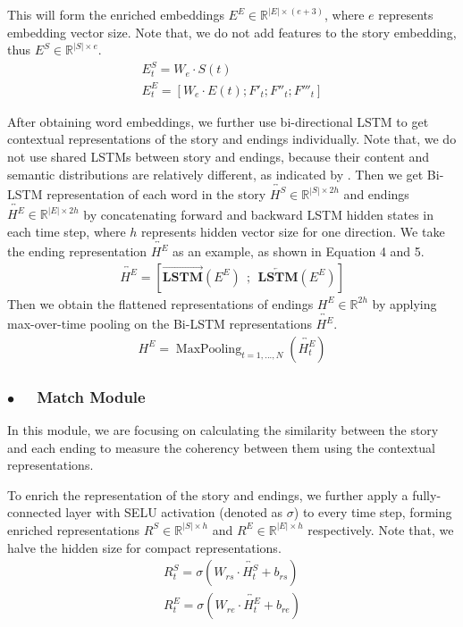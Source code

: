 \documentclass[letterpaper]{article} %
\begin{document}
This will form the enriched embeddings $E^E \in \mathbb{R}^{|E| \times (e+3)}$, where $e$ represents embedding vector size. Note that, we do not add features to the story embedding, thus $E^S \in \mathbb{R}^{|S| \times e}$.
\begin{gather}
E^S_t = W_e \cdot S(t) \\
E^E_t = [W_e \cdot E(t) ; F'_t ; F''_t ; F'''_t]
\end{gather}

After obtaining word embeddings, we further use bi-directional LSTM \cite{graves-etal-2005} to get contextual representations of the story and endings individually. 
Note that, we do not use shared LSTMs between story and endings, because their content and semantic distributions are relatively different, as indicated by \citeauthor{cai-etal-2017} . 
Then we get Bi-LSTM representation of each word in the story $\overleftrightarrow{H^S} \in \mathbb{R}^{|S| \times 2h}$ and endings $\overleftrightarrow{H^E}  \in \mathbb{R}^{|E| \times 2h}$ by concatenating forward and backward LSTM hidden states in each time step, where $h$ represents hidden vector size for one direction. We take the ending representation $\overleftrightarrow{H^E}$ as an example, as shown in Equation 4 and 5.
\begin{gather}
\overleftrightarrow{H^E} = [\overrightarrow{\mathbf{LSTM}}(E^E) ~~;~~ \overleftarrow{\mathbf{LSTM}}(E^E)] 
\end{gather}
Then we obtain the flattened representations of endings $H^{E} \in \mathbb{R}^{2h}$ by applying max-over-time pooling on the Bi-LSTM representations $\overleftrightarrow{H^E}$.
\begin{gather}
H^{E} = \mathop{MaxPooling}_{t=1,...,N}(\overleftrightarrow{H^E_t})
\end{gather}



\subsubsection*{$\bullet$~~ Match Module}
In this module, we are focusing on calculating the similarity between the story and each ending to measure the coherency between them using the contextual representations.

To enrich the representation of the story and endings, we further apply a fully-connected layer with SELU activation (denoted as $\sigma$) \cite{klambauer-etal-2017} to every time step, forming enriched representations $R^S \in \mathbb{R}^{|S| \times h}$ and $R^E \in \mathbb{R}^{|E| \times h}$ respectively. Note that, we halve the hidden size for compact representations.
\begin{gather}
R^S_t = \sigma(W_{rs} \cdot \overleftrightarrow{H^S_t} + b_{rs}) \\
R^E_t = \sigma(W_{re} \cdot \overleftrightarrow{H^E_t} + b_{re})
\end{gather}
\end{document}
